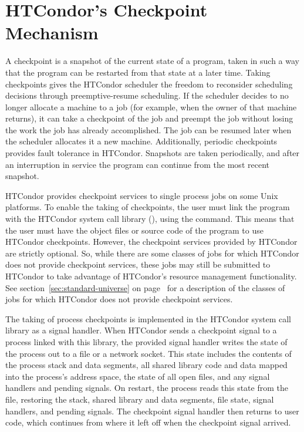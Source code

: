 \section{\label{ckpt-reference}
HTCondor's Checkpoint Mechanism}

A checkpoint is a snapshot of the current state of a program,
taken in such a way that the program can be restarted from that state at a
later time.  
Taking checkpoints gives the HTCondor scheduler the freedom to
reconsider scheduling decisions through preemptive-resume scheduling.
If the scheduler decides to no longer allocate a machine to a job (for
example, when the owner of that machine returns), it can take a checkpoint
of the job and preempt the job without losing the work the job has already
accomplished.  
The job can be resumed later when the scheduler allocates it a new machine.
Additionally, periodic checkpoints provides fault tolerance in HTCondor.  
Snapshots are taken periodically,
and after an interruption in service the program can continue from the
most recent snapshot.

HTCondor provides checkpoint services to single process jobs on some
Unix platforms.
To enable the taking of checkpoints, the user must link the program with the
HTCondor system call library (), using the
 command.
This means that the
user must have the object files or source code of the program to use
HTCondor checkpoints.  
However, the checkpoint services provided by
HTCondor are strictly optional.  
So, while there are some classes of
jobs for which HTCondor does not provide checkpoint services, 
these jobs may still be submitted to HTCondor to take advantage of HTCondor's
resource management functionality.  
See section~\ref{sec:standard-universe} on
page~\pageref{sec:standard-universe} for a description of the
classes of jobs for which HTCondor does not provide checkpoint services.

The taking of process checkpoints is implemented in the HTCondor 
system call library as a signal handler.
When HTCondor sends a checkpoint signal to a
process linked with this library, the provided signal handler writes
the state of the process out to a file or a network socket.  This
state includes the contents of the process stack and data segments,
all shared library code and data mapped into the process's address
space, the state of all open files, and any signal handlers and
pending signals.  On restart, the process reads this state from the
file, restoring the stack, shared library and data segments, file
state, signal handlers, and pending signals.  The checkpoint signal
handler then returns to user code, which continues from where it left
off when the checkpoint signal arrived.

